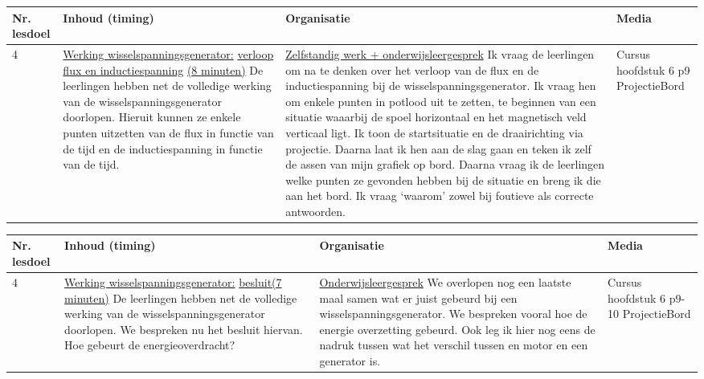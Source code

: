 \begin{landscape}
\begin{tabularx}{1.56\textwidth}{|p{1.5cm}|p{8cm}|X|p{4cm}|}
	\hline
	\textbf{Nr. lesdoel } & \textbf{Inhoud (timing)}  & \textbf{Organisatie } & \textbf{Media } \\ \hline
	4& \underline{Werking wisselspanningsgenerator:} \underline{verloop flux en inductiespanning} \underline{(8 minuten)}\newline
	De leerlingen hebben net de volledige werking van de wisselspanningsgenerator doorlopen. Hieruit kunnen ze enkele punten uitzetten van de flux in functie van de tijd en de inductiespanning in functie van de tijd. 
	&  \underline{Zelfstandig werk + onderwijsleergesprek}\newline  
	Ik vraag de leerlingen om na te denken over het verloop van de flux en de inductiespanning bij de wisselspanningsgenerator. Ik vraag hen om enkele punten in potlood uit te zetten, te beginnen van een situatie waaarbij de spoel horizontaal en het magnetisch veld verticaal ligt. Ik toon de startsituatie en de draairichting via projectie. Daarna laat ik hen aan de slag gaan en teken ik zelf de assen van mijn grafiek op bord. Daarna vraag ik de leerlingen welke punten ze gevonden hebben bij de situatie en breng ik die aan het bord. Ik vraag `waarom' zowel bij foutieve als correcte antwoorden.
	&  Cursus hoofdstuk 6 p9 \newline\newline Projectie\newline\newline Bord
	\\ \hline
\end{tabularx}\vspace{5mm}



\begin{tabularx}{1.56\textwidth}{|p{1.5cm}|p{8cm}|X|p{4cm}|}
	\hline
	\textbf{Nr. lesdoel } & \textbf{Inhoud (timing)}  & \textbf{Organisatie } & \textbf{Media } \\ \hline
	4& \underline{Werking wisselspanningsgenerator:} \underline{besluit(7 minuten)}\newline
	De leerlingen hebben net de volledige werking van de wisselspanningsgenerator doorlopen. We bespreken nu het besluit hiervan. Hoe gebeurt de energieoverdracht?
	&  \underline{Onderwijsleergesprek}\newline  
	We overlopen nog een laatste maal samen wat er juist gebeurd bij een wisselspanningsgenerator. We bespreken vooral hoe de energie overzetting gebeurd. Ook leg ik hier nog eens de nadruk tussen wat het verschil tussen en motor en een generator is.	
	&  Cursus hoofdstuk 6 p9-10 \newline\newline Projectie\newline\newline Bord
	\\ \hline
\end{tabularx}\vspace{5mm}





\end{landscape}
